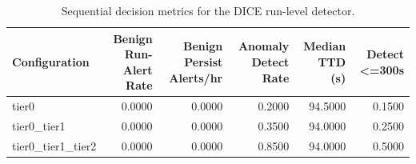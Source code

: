 \begin{table}[t]
\centering
\caption{Sequential decision metrics for the DICE run-level detector.}
\label{tab:dice_sequential_metrics}
\footnotesize
\begin{tabular}{lrrrrr}
\toprule
Configuration & Benign Run-Alert Rate & Benign Persist Alerts/hr & Anomaly Detect Rate & Median TTD (s) & Detect <=300s \\
\midrule
tier0 & 0.0000 & 0.0000 & 0.2000 & 94.5000 & 0.1500 \\
tier0_tier1 & 0.0000 & 0.0000 & 0.3500 & 94.0000 & 0.2500 \\
tier0_tier1_tier2 & 0.0000 & 0.0000 & 0.8500 & 94.0000 & 0.5000 \\
\bottomrule
\end{tabular}

\end{table}
